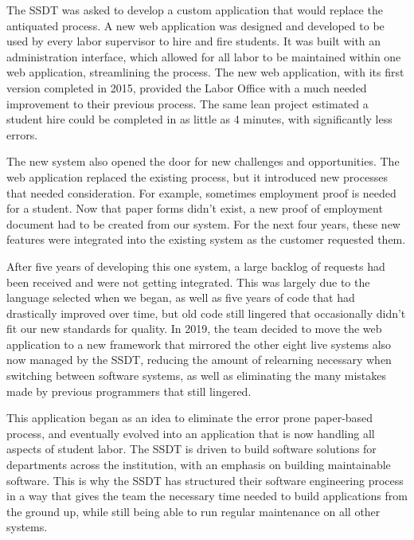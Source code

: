 The SSDT was asked to develop a custom application that would replace the antiquated process. A new web application was designed and developed to be used by every labor supervisor to hire and fire students. It was built with an administration interface, which allowed for all labor to be maintained within one web application, streamlining the process. The new web application, with its first version completed in 2015, provided the Labor Office with a much needed improvement to their previous process. The same lean project estimated a student hire could be completed in as little as 4 minutes, with significantly less errors.

The new system also opened the door for new challenges and opportunities. The web application replaced the existing process, but it introduced new processes that needed consideration. For example, sometimes employment proof is needed for a student. Now that paper forms didn't exist, a new proof of employment document had to be created from our system. For the next four years, these new features were integrated into the existing system as the customer requested them.

After five years of developing this one system, a large backlog of requests had been received and were not getting integrated. This was largely due to the language selected when we began, as well as five years of code that had drastically improved over time, but old code still lingered that occasionally didn't fit our new standards for quality. In 2019, the team decided to move the web application to a new framework that mirrored the other eight live systems also now managed by the SSDT, reducing the amount of relearning necessary when switching between software systems, as well as eliminating the many mistakes made by previous programmers that still lingered.

This application began as an idea to eliminate the error prone paper-based process, and eventually evolved into an application that is now handling all aspects of student labor. The SSDT is driven to build software solutions for departments across the institution, with an emphasis on building maintainable software. This is why the SSDT has structured their software engineering process in a way that gives the team the necessary time needed to build applications from the ground up, while still being able to run regular maintenance on all other systems.
